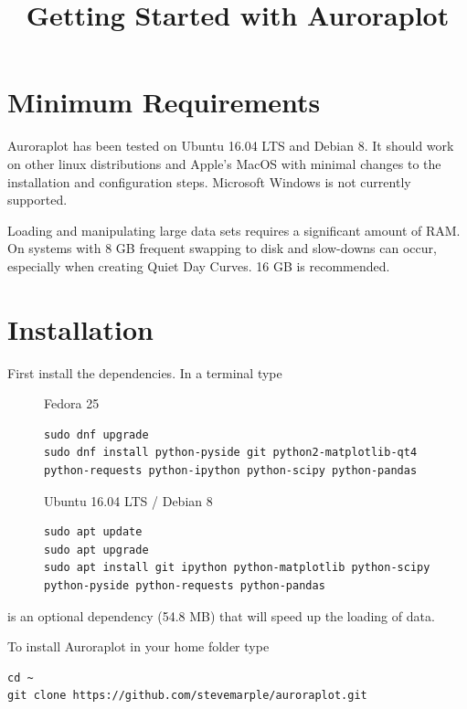 \documentclass{article}
\begin{document}
\title{Getting Started with Auroraplot}
\maketitle

\section{Minimum Requirements}

Auroraplot has been tested on Ubuntu 16.04 LTS and Debian 8.
It should work on other linux distributions and Apple's MacOS with minimal changes to the installation and configuration steps. Microsoft Windows is not currently supported.

Loading and manipulating large data sets requires a significant amount of RAM.
On systems with 8 GB frequent swapping to disk and slow-downs can occur,
especially when creating Quiet Day Curves. 16 GB is recommended.

\section{Installation}
\label{install}

First install the dependencies. In a terminal type

\begin{figure}[htb!]
\begin{minipage}[b]{0.45\linewidth}
Fedora 25
\begin{lstlisting}
sudo dnf upgrade
sudo dnf install python-pyside git python2-matplotlib-qt4 python-requests python-ipython python-scipy python-pandas
\end{lstlisting}
\end{minipage}
\hspace{0.5cm}
\begin{minipage}[b]{0.45\linewidth}
Ubuntu 16.04 LTS / Debian 8
\begin{lstlisting}
sudo apt update
sudo apt upgrade                 
sudo apt install git ipython python-matplotlib python-scipy python-pyside python-requests python-pandas 
\end{lstlisting}
\end{minipage} 
\end{figure}

 is an optional dependency (54.8 MB) that will speed up the loading of data.

To install Auroraplot in your home folder type
\begin{lstlisting}
cd ~
git clone https://github.com/stevemarple/auroraplot.git
\end{lstlisting}
\end{document}
